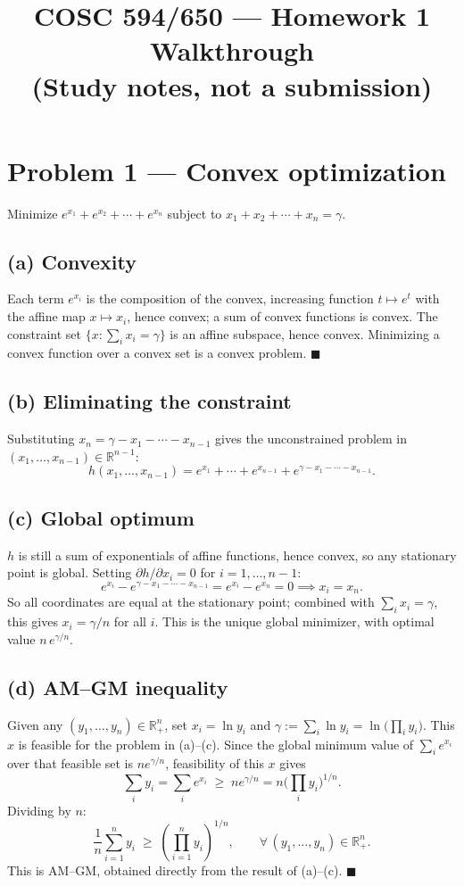 \documentclass[11pt]{article}
\title{COSC 594/650 --- Homework 1 Walkthrough\\ \large (Study notes, not a submission)}
\author{}
\date{}
\newcommand{\R}{\mathbb{R}}
\begin{document}
\maketitle

\section*{Problem 1 --- Convex optimization}

Minimize $e^{x_1}+e^{x_2}+\cdots+e^{x_n}$ subject to $x_1+x_2+\cdots+x_n=\gamma$.

\subsection*{(a) Convexity}
Each term $e^{x_i}$ is the composition of the convex, increasing function $t\mapsto e^t$ with the affine map $x \mapsto x_i$, hence convex; a sum of convex functions is convex. The constraint set $\{x : \sum_i x_i = \gamma\}$ is an affine subspace, hence convex. Minimizing a convex function over a convex set is a convex problem. $\blacksquare$

\subsection*{(b) Eliminating the constraint}
Substituting $x_n = \gamma - x_1 - \cdots - x_{n-1}$ gives the unconstrained problem in $(x_1,\dots,x_{n-1})\in\R^{n-1}$:
\[
h(x_1,\dots,x_{n-1}) = e^{x_1}+\cdots+e^{x_{n-1}} + e^{\gamma - x_1 - \cdots - x_{n-1}}.
\]

\subsection*{(c) Global optimum}
$h$ is still a sum of exponentials of affine functions, hence convex, so any stationary point is global. Setting $\partial h/\partial x_i = 0$ for $i=1,\dots,n-1$:
\[
e^{x_i} - e^{\gamma - x_1-\cdots-x_{n-1}} = e^{x_i}-e^{x_n} = 0 \implies x_i = x_n.
\]
So all coordinates are equal at the stationary point; combined with $\sum_i x_i = \gamma$, this gives $x_i = \gamma/n$ for all $i$. This is the unique global minimizer, with optimal value $n\,e^{\gamma/n}$.

\subsection*{(d) AM--GM inequality}
Given any $(y_1,\dots,y_n)\in\R^n_{+}$, set $x_i = \ln y_i$ and $\gamma := \sum_i \ln y_i = \ln\big(\prod_i y_i\big)$. This $x$ is feasible for the problem in (a)--(c). Since the global minimum value of $\sum_i e^{x_i}$ over that feasible set is $n e^{\gamma/n}$, feasibility of this $x$ gives
\[
\sum_i y_i = \sum_i e^{x_i} \;\ge\; n e^{\gamma/n} = n\Big(\prod_i y_i\Big)^{1/n}.
\]
Dividing by $n$:
\[
\frac{1}{n}\sum_{i=1}^n y_i \;\ge\; \left(\prod_{i=1}^n y_i\right)^{1/n}, \qquad \forall\,(y_1,\dots,y_n)\in\R^n_{+}.
\]
This is AM--GM, obtained directly from the result of (a)--(c). $\blacksquare$
\end{document}
